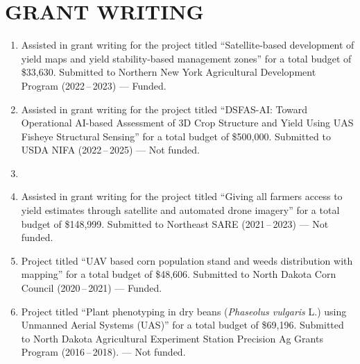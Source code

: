 \documentclass[11pt]{article}
\begin{document}
\section*{GRANT WRITING}
\begin{enumerate} [itemsep=-0.5ex]


\item Assisted in grant writing for the project titled ``Satellite-based development of yield maps and yield stability-based management zones'' for a total budget of \$33,630. Submitted to Northern New York Agricultural Development Program (2022\,--\,2023) --- Funded.

\item Assisted in grant writing for the project titled ``DSFAS-AI: Toward Operational AI-based Assessment of 3D Crop Structure and Yield Using UAS Fisheye Structural Sensing'' for a total budget of \$500,000. Submitted to USDA NIFA (2022\,--\,2025) --- Not funded.

\item {}

\item Assisted in grant writing for the project titled ``Giving all farmers access to yield estimates through satellite and automated drone imagery'' for a total budget of \$148,999. Submitted to Northeast SARE (2021\,--\,2023) --- Not funded.

\item Project titled ``UAV based corn population stand and weeds distribution with mapping'' for a total budget of \$48,606. Submitted to North Dakota Corn Council (2020\,--\,2021) --- Funded.

\item Project titled ``Plant phenotyping in dry beans (\textit{Phaseolus vulgaris} L.) using Unmanned Aerial Systems (UAS)'' for a total budget of \$69,196. Submitted to North Dakota Agricultural Experiment Station Precision Ag Grants Program (2016\,--\,2018). --- Not funded.

\end{enumerate}
\end{document}
